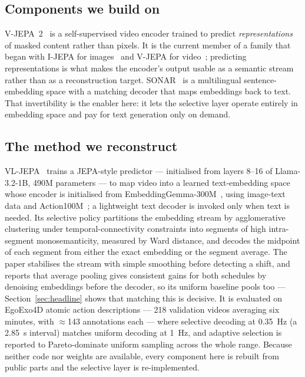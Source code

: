 \documentclass[journal]{IEEEtran}
\begin{document}
\subsection{Components we build on}
V-JEPA~2~\cite{vjepa2} is a self-supervised video encoder trained to predict
\emph{representations} of masked content rather than pixels. It is the current
member of a family that began with I-JEPA for images~\cite{ijepa2023} and V-JEPA
for video~\cite{vjepa2024}; predicting representations is what makes the encoder's
output usable as a semantic stream rather than as a reconstruction target.
SONAR~\cite{sonar2023} is a multilingual sentence-embedding space with a matching
decoder that maps embeddings back to text. That invertibility is the enabler here:
it lets the selective layer operate entirely in embedding space and pay for text
generation only on demand.

\subsection{The method we reconstruct}
VL-JEPA~\cite{vljepa2025} trains a JEPA-style predictor --- initialised from
layers 8--16 of Llama-3.2-1B, 490M parameters --- to map video into a learned
text-embedding space whose encoder is initialised from
EmbeddingGemma-300M~\cite{embeddinggemma2025}, using image-text data and
Action100M~\cite{action100m2026}; a lightweight text decoder is invoked only when
text is needed. Its selective policy partitions the embedding stream by
agglomerative clustering under temporal-connectivity constraints into segments of
high intra-segment monosemanticity, measured by Ward distance, and decodes the
midpoint of each segment from either the exact embedding or the segment average.
The paper stabilises the stream with simple smoothing before detecting a shift,
and reports that average pooling gives consistent gains for both schedules by
denoising embeddings before the decoder, so its uniform baseline pools too ---
Section~\ref{sec:headline} shows that matching this is decisive. It is evaluated on EgoExo4D
atomic action descriptions --- 218 validation videos averaging six minutes, with
$\approx$143 annotations each --- where selective decoding at 0.35~Hz (a 2.85~s
interval) matches uniform decoding at 1~Hz, and adaptive selection is reported to
Pareto-dominate uniform sampling across the whole range. Because neither code nor
weights are available, every component here is rebuilt from public parts and the
selective layer is re-implemented.
\end{document}
